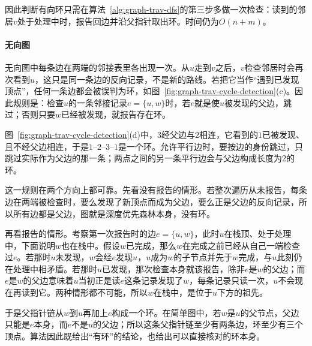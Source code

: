 因此判断有向环只需在算法~\ref{alg:graph-trav-dfs}的第三步多做一次检查：读到的邻居$v$处于处理中时，报告回边并沿父指针取出环。时间仍为$O(n+m)$。

\paragraph{无向图}
无向图中每条边在两端的邻接表里各出现一次。从$u$走到$v$之后，$v$检查邻居时会再次看到$u$，这只是同一条边的反向记录，不是新的路线。若把它当作“遇到已发现顶点”，任何一条边都会被误判为环，如图~\ref{fig:graph-trav-cycle-detection}(c)。因此规则是：检查$u$的一条邻接记录$e=\{u,w\}$时，若$e$就是使$u$被发现的父边，跳过；否则只要$w$已经被发现，就报告存在环。

图~\ref{fig:graph-trav-cycle-detection}(d)中，$3$经父边与$2$相连，它看到的$1$已被发现、且不经父边相连，于是$1\text{--}2\text{--}3\text{--}1$是一个环。允许平行边时，要按边的身份跳过，只跳过实际作为父边的那一条；两点之间的另一条平行边会与父边构成长度为$2$的环。

这一规则在两个方向上都可靠。先看没有报告的情形。若整次遍历从未报告，每条边在两端被检查时，要么发现了新顶点而成为父边，要么正是父边的反向记录，所以所有边都是父边，图就是深度优先森林本身，没有环。

再看报告的情形。考察第一次报告时的边$e=\{u,w\}$，此时$u$在栈顶、处于处理中，下面说明$w$也在栈中。假设$w$已完成，那么$w$在完成之前已经从自己一端检查过$e$。若那时$u$未发现，$w$会经$e$发现$u$，$u$成为$w$的子节点并先于$w$完成，与$u$此刻仍在处理中相矛盾。若那时$u$已发现，那次检查本身就该报告，除非$e$是$w$的父边；而$e$是$w$的父边意味着$u$当初正是读$e$这条记录发现了$w$，每条记录只读一次，$u$不会现在再读到它。两种情形都不可能，所以$w$在栈中，是位于$u$下方的祖先。

于是父指针链从$w$到$u$再加上$e$构成一个环。在简单图中，若$w$是$u$的父节点，父边只能是$e$本身，而$e$不是$u$的父边；所以这条父指针链至少有两条边，环至少有三个顶点。算法因此既给出“有环”的结论，也给出可以直接核对的环本身。
